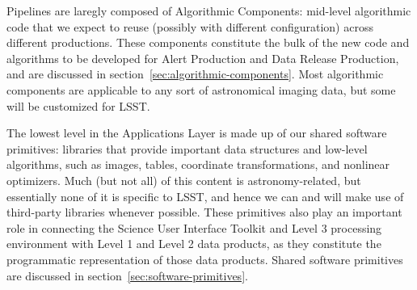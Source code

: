 Pipelines are laregly composed of Algorithmic Components: mid-level algorithmic code that we expect to reuse (possibly with different configuration) across different productions.  These components constitute the bulk of the new code and algorithms to be developed for Alert Production and Data Release Production, and are discussed in section~\ref{sec:algorithmic-components}.  Most algorithmic components are applicable to any sort of astronomical imaging data, but some will be customized for LSST.

The lowest level in the Applications Layer is made up of our shared software primitives: libraries that provide important data structures and low-level algorithms, such as images, tables, coordinate transformations, and nonlinear optimizers.  Much (but not all) of this content is astronomy-related, but essentially none of it is specific to LSST, and hence we can and will make use of third-party libraries whenever possible.  These primitives also play an important role in connecting the Science User Interface Toolkit and Level 3 processing environment with Level 1 and Level 2 data products, as they constitute the programmatic representation of those data products.  Shared software primitives are discussed in section~\ref{sec:software-primitives}.
